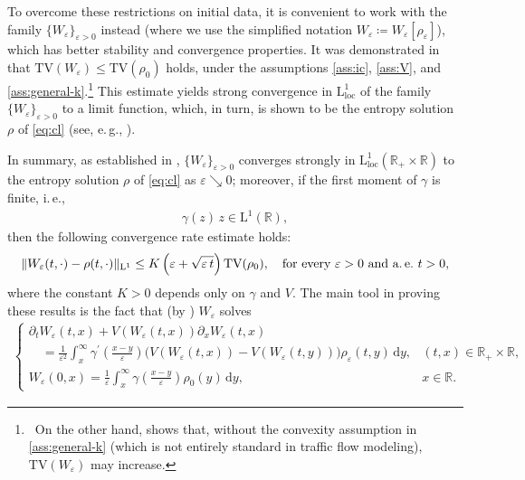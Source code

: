 \documentclass[10pt]{amsart}
\theoremstyle{plain}
\theoremstyle{definition}
\numberwithin{equation}{section}
\newcommand{\R}{\mathbb{R}}
\newcommand{\eps}{{\varepsilon}}
\newcommand{\dd}{\,\mathrm{d}}
\begin{document}
To overcome these restrictions on initial data, it is convenient to work with the family $\{W_{\varepsilon}\}_{\varepsilon >0}$ instead (where we use the simplified notation $W_\eps \coloneqq W_\eps[\rho_\eps]$), which has better stability and convergence properties.
It was demonstrated in \cite[Theorem 1.1]{MR4553943} that $\mathrm{TV}(W_\varepsilon) \le \mathrm{TV}(\rho_0)$ holds, under the assumptions \cref{ass:ic}, \cref{ass:V}, and \cref{ass:general-k}.\footnote{~On the other hand, \cite[Theorem 1.4]{MR4553943} shows that, without the convexity assumption in \cref{ass:general-k} (which is not entirely standard in traffic flow modeling), $\mathrm{TV}(W_\varepsilon)$ may increase.\label{ft:convexity}} This estimate yields strong convergence in \( \mathrm{L}^1_{\mathrm{loc}} \) of the family \( \{W_\varepsilon\}_{\varepsilon > 0} \) to a limit function, which, in turn, is shown to be the  entropy solution $\rho$ of \cref{eq:cl} (see, e.\,g., \cite[Theorem 1.2]{MR4553943}). 

In summary, as established in \cite[Theorem 1.3]{MR4553943}, $\{W_\eps\}_{\eps >0}$ converges strongly in $\mathrm{L}^1_{\mathrm{loc}}(\R_+\times\mathbb{R})$ to the entropy solution $\rho$ of \cref{eq:cl} as $\varepsilon \searrow 0$; moreover, if the first moment of $\gamma$ is finite, i.\,e., 
\begin{align}\label{ass:momentum}
    \gamma(z) \, z \in \mathrm{L}^1(\R),
\end{align}
then the following convergence rate estimate holds:
\begin{equation}\label{eq:rate-cont}
\|W_\eps(t, \cdot)- \rho(t,\cdot)\|_{\mathrm{L}^1} \leq K \left( \eps + \sqrt{\eps\, t} \right) \text{TV}(\rho_0), \quad \text{for every } \eps > 0 \text{ and a.\,e.~$t > 0$},
\end{equation}
where the constant $K>0$ depends only on $\gamma$ and $V$. 
The main tool in proving these results is the fact that (by \cite[Eq.~(3.1)]{MR4553943}) $W_\eps$ solves  \begin{align}\label{eq:Wevo-2}
\begin{cases}
\displaystyle  \partial_t W_{\eps}(t,x)+V\left(W_{\eps}(t,x)\right) \partial_x W_{\eps}(t,x) & {} \\ 
\displaystyle \quad=\frac{1}{\eps^2} \int_x^{\infty} \gamma^{\prime}\left(\frac{x-y}{\eps}\right)\big( V\left(W_{\eps}(t, x)\right)-V\left(W_{\eps}(t, y)\right) \big) \rho_{\eps}(t, y) \, \mathrm d y, & (t,x) \in \R_+ \times \R, \\ 
  \displaystyle  W_{\eps}(0,x)=\frac{1}{\eps}\int_{x}^{\infty}\gamma\left(\frac{x-y}{\eps}\right)\rho_{0}(y)\dd y, & x\in\R.
   \end{cases}
\end{align}
\end{document}
